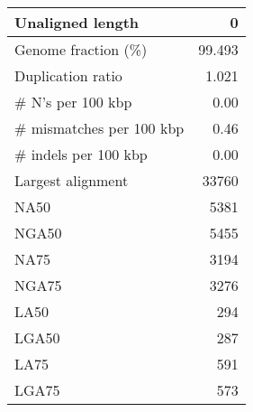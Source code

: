 \documentclass[12pt,a4paper]{article}
\begin{document}
\begin{table}[ht]
\begin{center}
\begin{tabular}{|l*{1}{|r}|}
Unaligned length & 0 \\ \hline
Genome fraction (\%) & 99.493 \\ \hline
Duplication ratio & 1.021 \\ \hline
\# N's per 100 kbp & 0.00 \\ \hline
\# mismatches per 100 kbp & 0.46 \\ \hline
\# indels per 100 kbp & 0.00 \\ \hline
Largest alignment & 33760 \\ \hline
NA50 & 5381 \\ \hline
NGA50 & 5455 \\ \hline
NA75 & 3194 \\ \hline
NGA75 & 3276 \\ \hline
LA50 & 294 \\ \hline
LGA50 & 287 \\ \hline
LA75 & 591 \\ \hline
LGA75 & 573 \\ \hline
\end{tabular}
\end{center}
\end{table}
\end{document}
